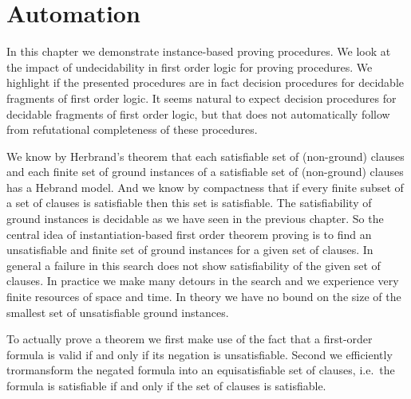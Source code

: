 
\chapter{Automation}



In this chapter we demonstrate instance-based proving procedures.
We look at the impact of undecidability in first order logic for proving procedures.
We highlight if the presented procedures are in fact decision procedures for decidable fragments of first order logic.
It seems natural to expect decision procedures for decidable fragments of first order logic,
but that does not automatically follow from refutational completeness of these procedures.


%
We know by Herbrand's theorem 
that each satisfiable set of (non-ground) clauses
and each finite set of ground instances of a satisfiable set of (non-ground) clauses
has a Hebrand model. 
And we know by compactness 
that if every finite subset of a set of clauses is satisfiable then this set is satisfiable.
The satisfiability of ground instances is decidable as we have seen in the previous chapter.
So the central idea of instantiation-based first order theorem proving 
is to find an unsatisfiable and finite set of ground instances for a given set of clauses.
In general a failure in this search does not show satisfiability of the given set of clauses.
In practice we make many detours in the search and we experience very finite resources of space and time. 
In theory we have no bound on the size of the smallest set of unsatisfiable ground instances.



To actually prove a theorem 
we first make use of the fact that a first-order formula is valid if and only if its negation is unsatisfiable.
Second we efficiently trormansform the negated formula into an {\myem equisatisfiable} set of clauses,
i.e.~the formula is satisfiable if and only if the set of clauses is satisfiable.

